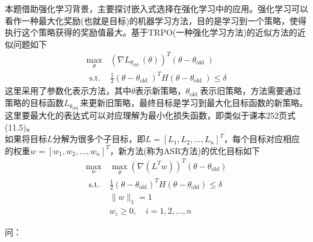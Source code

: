 \documentclass[answers]{exam}  %
\begin{document}
\begin{questions}
本题借助强化学习背景，主要探讨嵌入式选择在强化学习中的应用。强化学习可以看作一种最大化奖励(也就是目标)的机器学习方法，目的是学习到一个策略，使得执行这个策略获得的奖励值最大。基于TRPO(一种强化学习方法)的近似方法的近似问题如下
\begin{equation}
	\begin{array}{cc}
		\max\limits_{\theta} & \left(\nabla L_{\theta_{\text {old }}}(\theta)\right)^{T}\left(\theta-\theta_{\text {old }}\right) \\
		\text { s.t. } & \frac{1}{2}\left(\theta-\theta_{\text {old }}\right)^{T} H\left(\theta-\theta_{\text {old }}\right) \leq \delta
	\end{array}
\end{equation}
这里采用了参数化表示方法，其中$\theta$表示新策略，$\theta_{\text {old }}$表示旧策略，方法需要通过策略的目标函数$L_{\theta_{\text {old }}}$来更新旧策略，最终目标是学习到最大化目标函数的新策略。这里要最大化的表达式可以对应理解为最小化损失函数，即类似于课本252页式(11.5)。\\
如果将目标$L$分解为很多个子目标，即$L=\left[L_{1}, L_{2}, \ldots, L_{n}\right]^{T}$，每个目标对应相应的权重$w=\left[w_{1}, w_{2}, \ldots, w_{n}\right]^{T}$，新方法(称为ASR方法)的优化目标如下
\begin{equation}
	\begin{array}{cl}
		\max _{w} & \max _{\theta}\left(\nabla\left(L^{T} w\right)\right)^{T}\left(\theta-\theta_{\mathrm{old}}\right) \\
		\text { s.t. } & \frac{1}{2}\left(\theta-\theta_{\mathrm{old}}\right)^{T} H\left(\theta-\theta_{\mathrm{old}}\right) \leq \delta \\
		& \|w\|_{1}=1 \\
		& w_{i} \geq 0, \quad i=1,2, \ldots, n
	\end{array}
\end{equation}

问：


\end{questions}
\end{document}
